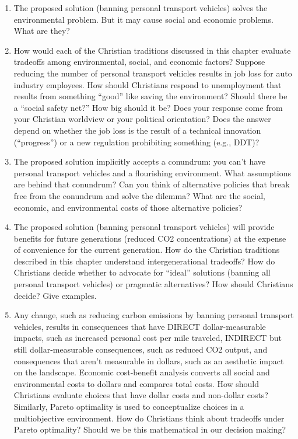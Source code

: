 \documentclass[12pt]{article}
\begin{document}
\begin{enumerate}
\item The proposed solution (banning personal transport vehicles) solves the environmental problem. But it may cause social and economic problems. What are they? 
\item How would each of the Christian traditions discussed in this chapter evaluate tradeoffs among environmental, social, and economic factors?
Suppose reducing the number of personal transport vehicles results in job loss for auto industry employees. How should Christians respond to unemployment that results from something “good” like saving the environment? Should there be a “social safety net?” How big should it be? Does your response come from your Christian worldview or your political orientation?  Does the answer depend on whether the job loss is the result of a technical innovation (“progress”) or a new regulation prohibiting something (e.g., DDT)?
\item The proposed solution implicitly accepts a conundrum: you can’t have personal transport vehicles and a flourishing environment. What assumptions are behind that conundrum? Can you think of alternative policies that break free from the conundrum and solve the dilemma? What are the social, economic, and environmental costs of those alternative policies?
\item The proposed solution (banning personal transport vehicles) will provide benefits for future generations (reduced CO2 concentrations) at the expense of convenience for the current generation. How do the Christian traditions described in this chapter understand intergenerational tradeoffs?
How do Christians decide whether to advocate for “ideal” solutions (banning all personal transport vehicles) or pragmatic alternatives? How should Christians decide? Give examples.
\item Any change, such as reducing carbon emissions by banning personal transport vehicles, results in consequences that have DIRECT dollar-measurable impacts, such as increased personal cost per mile traveled, INDIRECT but still dollar-measurable consequences, such as reduced CO2 output, and consequences that aren’t measurable in dollars, such as an aesthetic impact on the landscape. Economic cost-benefit analysis converts all social and environmental costs to dollars and compares total costs. How should Christians evaluate choices that have dollar costs and non-dollar costs? Similarly, Pareto optimality is used to conceptualize choices in a multiobjective environment. How do Christians think about tradeoffs under Pareto optimality? Should we be this mathematical in our decision making?

\end{enumerate}
\end{document}
